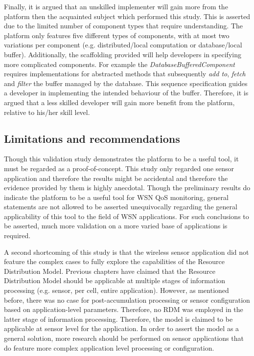 Finally, it is argued that an unskilled implementer will gain more from the platform then the acquainted subject which performed this study. This is asserted due to the limited number of component types that require understanding. The platform only features five different types of components, with at most two variations per component (e.g. distributed/local computation or database/local buffer). Additionally, the scaffolding provided will help developers in specifying more complicated components. For example the \emph{DatabaseBufferedComponent} requires implementations for abstracted methods that subsequently \emph{add to}, \emph{fetch} and \emph{filter} the buffer managed by the database. This sequence specification guides a developer in implementing the intended behaviour of the buffer. Therefore, it is argued that a less skilled developer will gain more benefit from the platform, relative to his/her skill level.

\subsection{Limitations and recommendations}
Though this validation study demonstrates the platform to be a useful tool, it must be regarded as a proof-of-concept. This study only regarded one sensor application and therefore the results might be accidental and therefore the evidence provided by them is highly anecdotal. Though the preliminary results do indicate the platform to be a useful tool for WSN QoS monitoring, general statements are not allowed to be asserted unequivocally regarding the general applicability of this tool to the field of WSN applications. For such conclusions to be asserted, much more validation on a more varied base of applications is required.

A second shortcoming of this study is that the \sensit wireless sensor application did not feature the complex cases to fully explore the capabilities of the Resource Distribution Model. Previous chapters have claimed that the Resource Distribution Model should be applicable at multiple stages of information processing (e.g. sensor, per cell, entire application). However, as mentioned before, there was no case for post-accumulation processing or sensor configuration based on application-level parameters. Therefore, no RDM was employed in the latter stage of information processing. Therefore, the model is claimed to be applicable at sensor level for the \sensit application. In order to assert the model as a general solution, more research should be performed on sensor applications that do feature more complex application level processing or configuration.

